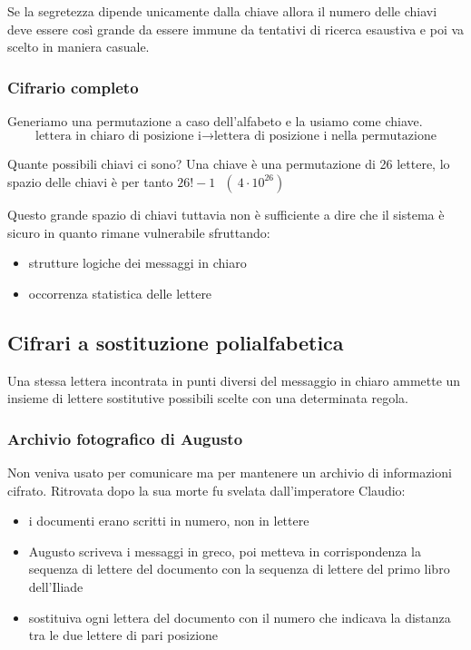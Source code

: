 Se la segretezza dipende unicamente dalla chiave allora il numero delle chiavi deve essere così grande da essere immune da tentativi di ricerca esaustiva e poi va scelto in maniera casuale.

\subsubsection{Cifrario completo}
Generiamo una permutazione a caso dell'alfabeto e la usiamo come chiave.
$$ \text{lettera in chiaro di posizione i} \xrightarrow{} \text{lettera di posizione i nella permutazione} $$

Quante possibili chiavi ci sono? Una chiave è una permutazione di 26 lettere, lo spazio delle chiavi è per tanto $26! - 1 \text{ } (~4 \cdot 10^{26})$

Questo grande spazio di chiavi tuttavia non è sufficiente a dire che il sistema è sicuro in quanto rimane vulnerabile sfruttando:
\begin{itemize}
    \item strutture logiche dei messaggi in chiaro
    \item occorrenza statistica delle lettere
\end{itemize}

\subsection{Cifrari a sostituzione polialfabetica}
Una stessa lettera incontrata in punti diversi del messaggio in chiaro ammette un insieme di lettere sostitutive possibili scelte con una determinata regola.

\subsubsection{Archivio fotografico di Augusto}
Non veniva usato per comunicare ma per mantenere un archivio di informazioni cifrato. Ritrovata dopo la sua morte fu svelata dall'imperatore Claudio:
\begin{itemize}
    \item i documenti erano scritti in numero, non in lettere
    \item Augusto scriveva i messaggi in greco, poi metteva in corrispondenza la sequenza di lettere del documento con la sequenza di lettere del primo libro dell'Iliade
    \item sostituiva ogni lettera del documento con il numero che indicava la distanza tra le due lettere di pari posizione
\end{itemize}

